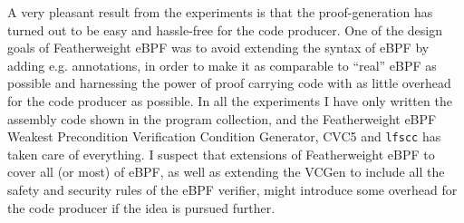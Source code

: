 A very pleasant result from the experiments is that the proof-generation has turned out to be easy and hassle-free for the code producer. One of the design goals of Featherweight eBPF was to avoid extending the syntax of eBPF by adding e.g. annotations, in order to make it as comparable to ``real'' eBPF as possible and harnessing the power of proof carrying code with as little overhead for the code producer as possible. In all the experiments I have only written the assembly code shown in the program collection, and the Featherweight eBPF Weakest Precondition Verification Condition Generator, CVC5 and \texttt{lfscc} has taken care of everything.
I suspect that extensions of Featherweight eBPF to cover all (or most) of eBPF, as well as extending the VCGen to include all the safety and security rules of the eBPF verifier, might introduce some overhead for the code producer if the idea is pursued further. 



